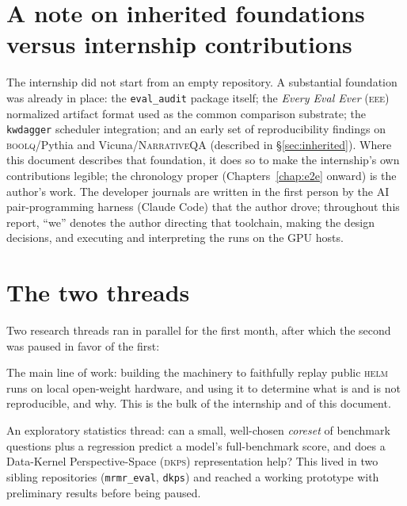 \documentclass[11pt]{report}
\newcommand{\eeeshort}{\textsc{eee}\xspace}
\newcommand{\code}[1]{\texttt{#1}}
\newcommand{\file}[1]{\texttt{#1}}
\begin{document}
\section{A note on inherited foundations versus internship contributions}

The internship did not start from an empty repository. A substantial foundation
was already in place: the \file{eval\_audit} package itself; the \emph{Every Eval
Ever} (\eeeshort) normalized artifact format used as the common comparison
substrate; the \code{kwdagger} scheduler integration; and an early set of
reproducibility findings on \textsc{boolq}/Pythia and Vicuna/\textsc{NarrativeQA}
(described in \S\ref{sec:inherited}). Where this document describes that
foundation, it does so to make the internship's own contributions legible; the
chronology proper (Chapters~\ref{chap:e2e} onward) is the author's work. The
developer journals are written in the first person by the AI pair-programming
harness (Claude Code) that the author drove; throughout this report, ``we'' denotes
the author directing that toolchain, making the design decisions, and executing and
interpreting the runs on the GPU hosts.

\section{The two threads}

Two research threads ran in parallel for the first month, after which the second
was paused in favor of the first:

\begin{description}[style=nextline,leftmargin=1.5em]
  \item[Thread A --- \textsc{helm} reproduction (Chapters \ref{chap:framing}--\ref{chap:reporting}).]
    The main line of work: building the machinery to faithfully replay public
    \textsc{helm} runs on local open-weight hardware, and using it to determine
    what is and is not reproducible, and why. This is the bulk of the internship
    and of this document.
  \item[Thread B --- efficient benchmarking (Chapter \ref{chap:effbench}).]
    An exploratory statistics thread: can a small, well-chosen \emph{coreset} of
    benchmark questions plus a regression predict a model's full-benchmark score,
    and does a Data-Kernel Perspective-Space (\textsc{dkps}) representation help?
    This lived in two sibling repositories (\file{mrmr\_eval}, \file{dkps}) and
    reached a working prototype with preliminary results before being paused.
\end{description}
\end{document}
